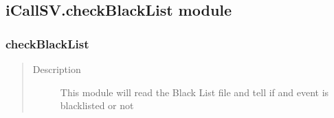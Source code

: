 \documentclass[letterpaper,10pt,english]{sphinxmanual}
\begin{document}
\subsection{iCallSV.checkBlackList module}
\label{iCallSV:icallsv-checkblacklist-module}\label{iCallSV:module-iCallSV.checkBlackList}

\subsubsection{checkBlackList}
\label{iCallSV:checkblacklist}\begin{quote}\begin{description}
\item[{Description}] \leavevmode
This module will read the Black List file and tell if and event is blacklisted or not

\end{description}\end{quote}
\end{document}
